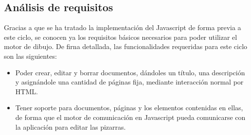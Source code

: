 \subsection{Análisis de requisitos} %
\label{sub:análisis_de_requisitos}

Gracias a que se ha tratado la implementación del Javascript de forma previa a este ciclo, se conocen ya los requisitos básicos necesarios para poder utilizar el motor de dibujo. De firna detallada, las funcionalidades requeridas para este ciclo son las siguientes:

\begin{itemize}
  \item Poder crear, editar y borrar documentos, dándoles un título, una descripción y asignándole una cantidad de páginas fija, mediante interacción normal por HTML.
  \item Tener soporte para documentos, páginas y los elementos contenidas en ellas, de forma que el motor de comunicación en Javascript pueda comunicarse con la aplicación para editar las pizarras.
\end{itemize}




